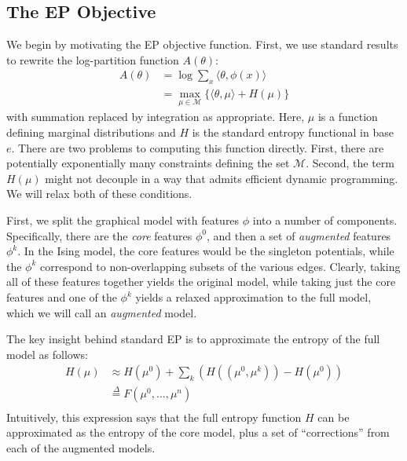 \documentclass[times, 10pt,twocolumn]{article}
\begin{document}
\subsection{The EP Objective}

We begin by motivating the EP objective function. First, we use standard results to rewrite the log-partition
function $A(\theta)$:
\begin{equation}
  \begin{split}
     A(\theta) &= \log \sum_x \langle\theta,\phi(x)\rangle\\
     &= \max_{\mu \in \mathcal{M}} \{ \langle\theta,\mu\rangle + H(\mu) \}
   \end{split}
 \end{equation}
with summation replaced by integration as appropriate. Here, $\mu$
is a function defining marginal distributions and $H$ is the standard
entropy functional in base $e$. There are two problems to computing
this function directly. First, there are potentially exponentially
many constraints defining the set $\mathcal M$. Second, the term
$H(\mu)$ might not decouple in a way that admits efficient dynamic
programming. We will relax both of these conditions.

First, we split the graphical model with features $\phi$ into
a number of components. Specifically, there are the \textit{core}
features $\phi^0$, and then a set of \textit{augmented}
features $\phi^k$. In the Ising model, the core features would
be the singleton potentials, while the $\phi^k$ correspond to
non-overlapping subsets of the various edges. Clearly, taking all
of these features together yields the original model, while taking
just the core features and one of the $\phi^k$ yields 
a relaxed approximation to the full model, which we will call an
\textit{augmented} model.

The key insight behind standard EP is to approximate the entropy of
the full model as follows:
\begin{equation}
  \begin{split}
     H(\mu) &\approx H(\mu^0) + \sum_k \left ( H( (\mu^0,\mu^k)) -
     H(\mu^0)\right) \\
     & \stackrel{\Delta}= F(\mu^0, \ldots, \mu^n) \\
     \label{eqn:epentropy}
   \end{split}
 \end{equation}
Intuitively, this expression says that the full entropy function
$H$ can be approximated as the entropy of the core model, plus
a set of ``corrections'' from each of the augmented models.
\end{document}
